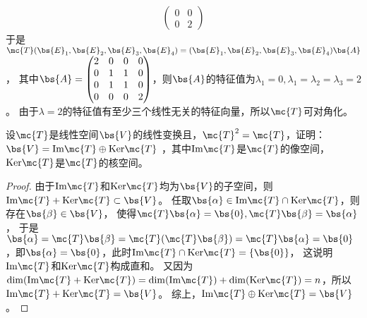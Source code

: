 \documentclass[12pt, a4paper, oneside, UTF8]{ctexbook}
\begin{document}
\begin{solution}
\begin{enumerate}[label=(\arabic{*})]
\begin{align*}
\begin{pmatrix}
                0&0\\
                0&2
            \end{pmatrix}
        \end{align*}
        于是$\mc{T}(\bs{E}_1,\bs{E}_2,\bs{E}_3,\bs{E}_4)=(\bs{E}_1,\bs{E}_2,\bs{E}_3,\bs{E}_4)\bs{A}$，
        其中$\bs{A}=\begin{pmatrix}
            2&0 &0 &0 \\
            0&1 &1 &0 \\
            0& 1& 1&0 \\
            0& 0&0 &2 
        \end{pmatrix}$，则$\bs{A}$的特征值为$\lambda_1=0,\lambda_1=\lambda_2=\lambda_3=2$。
        由于$\lambda=2$的特征值有至少三个线性无关的特征向量，所以$\mc{T}$可对角化。
    \end{enumerate}
\end{solution}

\begin{question}
    设$\mc{T}$是线性空间$\bs{V}$的线性变换且，$\mc{T}^2=\mc{T}$，证明：$\bs{V}=\mathrm{Im}\mc{T}\oplus \mathrm{Ker}\mc{T}$
，其中$\mathrm{Im}\mc{T}$是$\mc{T}$的像空间，$\mathrm{Ker}\mc{T}$是$\mc{T}$的核空间。
\end{question}

\begin{proof}
    由于$\mathrm{Im}\mc{T}$和$\mathrm{Ker}\mc{T}$均为$\bs{V}$的子空间，则
    $\mathrm{Im}\mc{T}+ \mathrm{Ker}\mc{T} \subset \bs{V}$。
    任取$\bs{\alpha}\in \mathrm{Im}\mc{T}\cap \mathrm{Ker}\mc{T}$，则存在$\bs{\beta}\in \bs{V}$，
    使得$\mc{T}\bs{\alpha}=\bs{0},\mc{T} \bs{\beta}=\bs{\alpha} $，
    于是$\bs{\alpha}=\mc{T}\bs{\beta}=\mc{T}(\mc{T} \bs{\beta})=
    \mc{T}\bs{\alpha}=\bs{0}$，即$\bs{\alpha}=\bs{0}$，此时$\mathrm{Im}\mc{T}\cap \mathrm{Ker}\mc{T}=\{\bs{0}\}$，
    这说明$\mathrm{Im}\mc{T}$和$\mathrm{Ker}\mc{T}$构成直和。
    又因为$\mathrm{dim}(\mathrm{Im}\mc{T}+\mathrm{Ker}\mc{T})=\mathrm{dim}(\mathrm{Im}\mc{T})
    +\mathrm{dim}(\mathrm{Ker}\mc{T})=n$，所以$\mathrm{Im}\mc{T}+ \mathrm{Ker}\mc{T} = \bs{V}$。
    综上，$\mathrm{Im}\mc{T}\oplus \mathrm{Ker}\mc{T} = \bs{V}$。
    
\end{proof}

\ifx\allfiles\undefined
\end{document}
